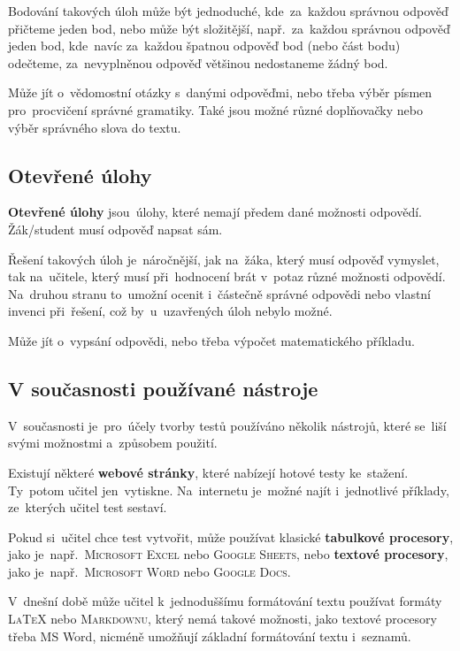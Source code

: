 \documentclass[14pt,a4paper]{article}
\begin{document}
        Bodování takových úloh může být jednoduché, kde~za~každou správnou odpověď přičteme jeden bod, nebo může být složitější, např.~za~každou správnou odpověď jeden bod, kde~navíc za~každou špatnou odpověď bod (nebo část bodu) odečteme, za~nevyplněnou odpověď většinou nedostaneme žádný bod.

        Může jít o~vědomostní otázky s~danými odpověďmi, nebo třeba výběr písmen pro~procvičení správné gramatiky. Také jsou možné různé doplňovačky nebo výběr správného slova do textu.

        \subsection{Otevřené úlohy}
        \textbf{Otevřené úlohy} jsou~úlohy, které nemají předem dané možnosti odpovědí. Žák/student musí odpověď napsat sám.

        Řešení takových úloh je~náročnější, jak na~žáka, který musí odpověď vymyslet, tak na~učitele, který musí při~hodnocení brát v~potaz různé možnosti odpovědí. Na~druhou stranu to~umožní ocenit i~částečně správné odpovědi nebo vlastní invenci při~řešení, což by~u~uzavřených úloh nebylo možné.

        Může jít o~vypsání odpovědi, nebo třeba výpočet matematického příkladu. \parencite{rozhlasOUtazky}
        
        \subsection{V současnosti používané nástroje}
        V~současnosti je~pro~účely tvorby testů používáno několik nástrojů, které se~liší svými možnostmi a~způsobem použití.
        
        Existují některé \textbf{webové stránky}, které nabízejí hotové testy ke~stažení. Ty~potom učitel jen~vytiskne. Na~internetu je~možné najít i~jednotlivé příklady, ze~kterých učitel test sestaví.

        Pokud si~učitel chce test vytvořit, může používat klasické \textbf{tabulkové procesory}, jako je~např.~\textsc{Microsoft Excel} nebo \textsc{Google Sheets}, nebo \textbf{textové procesory}, jako je~např.~\textsc{Microsoft Word} nebo \textsc{Google Docs}.

        V~dnešní době může učitel k~jednoduššímu formátování textu používat formáty \textsc{\LaTeX} nebo \textsc{Markdownu}, který nemá takové možnosti, jako textové procesory třeba MS Word, nicméně umožňují základní formátování textu i~seznamů.
\end{document}
